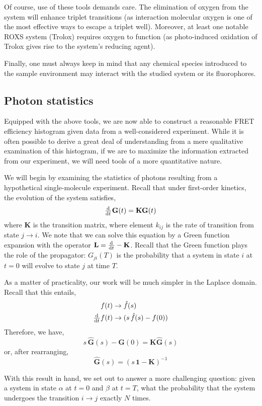 \documentclass{article}
\begin{document}
Of course, use of these tools demands care. The elimination of oxygen
from the system will enhance triplet transitions (as interaction
molecular oxygen is one of the most effective ways to escape a triplet
well\cite{Campos2011}). Moreover, at least one notable ROXS system
(Trolox) requires oxygen to function (as photo-induced oxidation of
Trolox gives rise to the system's reducing agent\cite{Cordes2009}).

Finally, one must always keep in mind that any chemical species
introduced to the sample environment may interact with the studied
system or its fluorophores.

\subsection{Photon statistics}
Equipped with the above tools, we are now able to construct a
reasonable FRET efficiency histogram given data from a well-considered
experiment. While it is often possible to derive a great deal of
understanding from a mere qualitative examination of this histogram,
if we are to maximize the information extracted from our experiment,
we will need tools of a more quantitative nature.

We will begin by examining the statistics of photons resulting from a
hypothetical single-molecule experiment. Recall that under first-order
kinetics, the evolution of the system satisfies,
\[ \od{}{t} \mathbf{G}(t) = \mathbf{K} \mathbf{G}(t) \]
where $\mathbf{K}$ is the transition matrix, where element $k_{ij}$ is
the rate of transition from state $j \rightarrow i$. We note that we
can solve this equation by a Green function expansion with the
operator $\mathbf{L} = \od{}{t} - \mathbf{K}$. Recall that the
Green function plays the role of the propagator: $G_{ji}(T)$ is the
probability that a system in state $i$ at $t=0$ will evolve to state
$j$ at time $T$.

As a matter of practicality, our work will be much simpler in the
Laplace domain. Recall that this entails,
\begin{align*}
f(t) & \rightarrow \hat f(s) \\
\od{}{t} f(t) & \rightarrow (s\, \hat f(s) - f(0)) \\
\end{align*}
Therefore, we have,
\[ s\, \mathbf{\hat G}(s) - \mathbf{G}(0) = \mathbf{K} \mathbf{\hat G}(s) \]
or, after rearranging,
\[ \mathbf{\hat G}(s) = (s\, \mathbf{1} - \mathbf{K})^{-1} \]

With this result in hand, we set out to answer a more challenging
question: given a system in state $\alpha$ at $t=0$ and $\beta$ at
$t=T$, what the probability that the system undergoes the transition
$i \rightarrow j$ exactly $N$ times.
\end{document}
